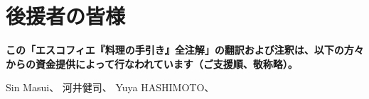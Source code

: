 \hypertarget{benefactors}{%
\section{後援者の皆様}\label{benefactors}}

\thispagestyle{empty}

\textbf{この「エスコフィエ『料理の手引き』全注解」の翻訳および注釈は、以下の方々からの資金提供によって行なわれています（ご支援順、敬称略）。}

Sin Masui、\href{20180524-23h,2x}{} 河井健司、\href{20180525-0h14,10x}{}
Yuya HASHIMOTO、\href{20180525-1h40,2x}{}
